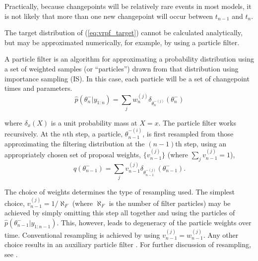 \documentclass[peerreview,11pt,draftcls,onecolumn]{IEEEtran}
\begin{document}

Practically, because changepoints will be relatively rare events in most models, it is not likely that more than one new changepoint will occur between $t_{n-1}$ and $t_n$.

The target distribution of (\ref{eq:vrpf_target}) cannot be calculated analytically, but may be approximated numerically, for example, by using a particle filter.

A particle filter is an algorithm for approximating a probability distribution using a set of weighted samples (or ``particles'') drawn from that distribution using importance sampling (IS). In this case, each particle will be a set of changepoint times and parameters.
%
\begin{equation}
 \hat{p}(\theta_{n}^-|y_{1:n}) = \sum_j w_n^{(j)} \delta_{\theta_{n}^{-(j)}}(\theta_{n}^-) \label{eq:vrpf}
\end{equation}

where $\delta_x(X)$ is a unit probability mass at $X=x$. The particle filter works recursively. At the $n$th step, a particle, $\theta_{n-1}^{-(i)}$, is first resampled from those approximating the filtering distribution at the $(n-1)$th step, using an appropriately chosen set of proposal weights, $\{v_{n-1}^{(j)}\}$ (where $\sum_j v_{n-1}^{(j)} = 1$),
%
\begin{equation}
 q(\theta_{n-1}^-) = \sum_j v_{n-1}^{(j)} \delta_{\theta_{n-1}^{-(j)}}(\theta_{n-1}^-)     .
\end{equation}

The choice of weights determines the type of resampling used. The simplest choice, $v_{n-1}^{(j)} = 1/\aleph_F$ (where $\aleph_F$ is the number of filter particles) may be achieved by simply omitting this step all together and using the particles of $\hat{p}(\theta_{n-1}^-|y_{1:n-1})$. This, however, leads to degeneracy of the particle weights over time. Conventional resampling is achieved by using $v_{n-1}^{(j)} = w_{n-1}^{(j)}$. Any other choice results in an auxiliary particle filter \cite{Pitt1999}. For further discussion of resampling, see \cite{Cappe2007,Doucet2009}.
\end{document}
